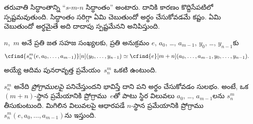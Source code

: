 \documentclass[../../../include/open-logic-section]{subfiles}
\begin{document}

\begin{explain}
తరువాతి సిద్ధాంతాన్ని ``$s$-$m$-$n$ సిద్ధాంతం'' అంటారు. దానికి కారణం
కొద్దిసేపటిలో స్పష్టమవుతుంది. సిద్ధాంతం సరిగ్గా ఏమి చెబుతుందో అర్థం
చేసుకోవడమే కష్టం. ఏమి చెబుతుందో అర్థమైతే అది దాదాపు స్పష్టమేనని
అనిపిస్తుంది.
\end{explain}

\begin{thm}
  $n$,~$m$ అనే ప్రతి జత సహజ సంఖ్యలకు, ప్రతి అనుక్రమం
  $e$, $a_0$, \dots, $a_{m-1}$, $y_0$, \dots, $y_{n-1}$కు
  \[
  \cfind{s^m_n(e, a_0, \dots, a_{m-1})}[n](y_0, \dots, y_{n-1}) \simeq
  \cfind{e}[m+n](a_0, \dots, a_{m-1}, y_0, \dots, y_{n-1}).
\]
  అయ్యే ఆదిమ పునరావృత్త ప్రమేయం~$s^m_n$ ఒకటి ఉంటుంది.
\end{thm}

\begin{explain}
$s^m_n$ అనేది \emph{ప్రోగ్రాములపై} పనిచేస్తుందని భావిస్తే దాని పని అర్థం చేసుకోవడం సులభం.
అంటే, ఒక $(m+n)$-స్థాన ప్రమేయానికి ప్రోగ్రాము~$e$తో పాటు స్థిర
విలువలు $a_0$, \dots, $a_{m-1}$లను $s^m_n$ తీసుకుంటుంది. మిగిలిన
విలువలపై ఆధారపడే $n$-స్థాన ప్రమేయానికి ప్రోగ్రాము
$s^m_n(e,a_0,\dots,a_{m-1})$ను ఇస్తుంది.
\end{explain}
\end{document}
